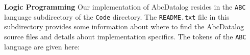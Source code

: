 \begin{minipage}[t]{\sw}
\slidenumber
\LARGE
{\bf Logic Programming}\exx
Our implementation of AbcDatalog resides
in the \verb'ABC' language subdirectory of the \verb'Code' directory.
The \verb'README.txt' file in this subdirectory provides
some information about where to find the AbcDatalog source files
and details about implementation specifics.\exx
The tokens of the \verb'ABC' language are given here:
{\Large
{}
}
\end{minipage}
